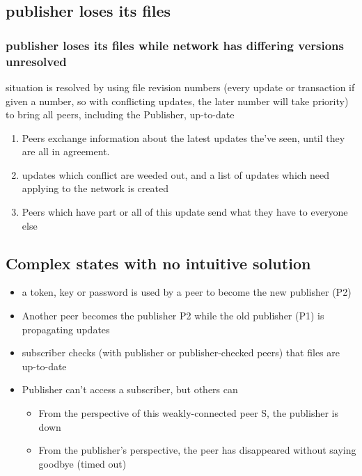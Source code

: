 \documentclass[12pt,a4paper,]{adreport}
\begin{document}
\subsection{publisher loses its files}\label{publisher-loses-its-files}

\subsubsection{publisher loses its files while network has differing
versions
unresolved}\label{publisher-loses-its-files-while-network-has-differing-versions-unresolved}

situation is resolved by using file revision numbers (every update or
transaction if given a number, so with conflicting updates, the later
number will take priority) to bring all peers, including the Publisher,
up-to-date

\begin{enumerate}
\def\labelenumi{\arabic{enumi}.}
\itemsep1pt\parskip0pt
\item
  Peers exchange information about the latest updates the've seen, until
  they are all in agreement.
\item
  updates which conflict are weeded out, and a list of updates which
  need applying to the network is created
\item
  Peers which have part or all of this update send what they have to
  everyone else
\end{enumerate}

\subsection{Complex states with no intuitive
solution}\label{complex-states-with-no-intuitive-solution}

\begin{itemize}
\itemsep1pt\parskip0pt
\item
  a token, key or password is used by a peer to become the new publisher
  (P2)
\item
  Another peer becomes the publisher P2 while the old publisher (P1) is
  propagating updates
\item
  subscriber checks (with publisher or publisher-checked peers) that
  files are up-to-date
\item
  Publisher can't access a subscriber, but others can

  \begin{itemize}
  \itemsep1pt\parskip0pt
  \item
    From the perspective of this weakly-connected peer S, the publisher
    is down
  \item
    From the publisher's perspective, the peer has disappeared without
    saying goodbye (timed out)
  \end{itemize}
\end{itemize}
\end{document}
